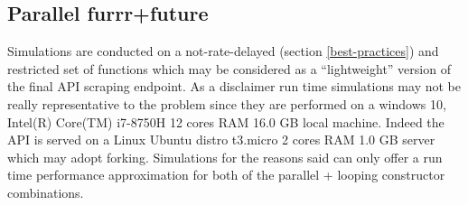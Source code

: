 \documentclass[
  12pt,
  a4paper,
  oneside]{book}
\theoremstyle{definition}
\theoremstyle{definition}
\theoremstyle{definition}
\theoremstyle{remark}
\begin{document}
\hypertarget{parallel-furrrfuture}{%
\subsection{Parallel furrr+future}\label{parallel-furrrfuture}}

Simulations are conducted on a not-rate-delayed (section \ref{best-practices}) and restricted set of functions which may be considered as a ``lightweight'' version of the final API scraping endpoint.
As a disclaimer run time simulations may not be really representative to the problem since they are performed on a windows 10, Intel(R) Core(TM) i7-8750H 12 cores RAM 16.0 GB local machine. Indeed the API is served on a Linux Ubuntu distro t3.micro 2 cores RAM 1.0 GB server which may adopt forking. Simulations for the reasons said can only offer a run time performance approximation for both of the parallel + looping constructor combinations.
\end{document}
